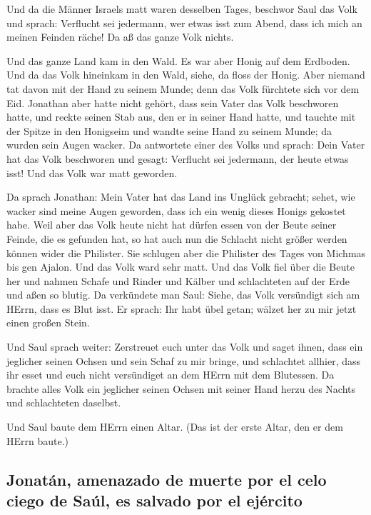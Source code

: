  Und da die Männer Israels matt waren desselben Tages,
beschwor Saul das Volk und sprach: Verflucht sei jedermann, wer etwas
isst zum Abend, dass ich mich an meinen Feinden räche! Da aß das ganze
Volk nichts.

 Und das ganze Land kam in den Wald. Es war aber Honig
auf dem Erdboden.  Und da das Volk hineinkam in den Wald,
siehe, da floss der Honig. Aber niemand tat davon mit der Hand zu seinem
Munde; denn das Volk fürchtete sich vor dem Eid. 
Jonathan aber hatte nicht gehört, dass sein Vater das Volk beschworen
hatte, und reckte seinen Stab aus, den er in seiner Hand hatte, und
tauchte mit der Spitze in den Honigseim und wandte seine Hand zu seinem
Munde; da wurden sein Augen wacker.  Da antwortete einer
des Volks und sprach: Dein Vater hat das Volk beschworen und gesagt:
Verflucht sei jedermann, der heute etwas isst! Und das Volk war matt
geworden.

 Da sprach Jonathan: Mein Vater hat das Land ins Unglück
gebracht; sehet, wie wacker sind meine Augen geworden, dass ich ein
wenig dieses Honigs gekostet habe.  Weil aber das Volk
heute nicht hat dürfen essen von der Beute seiner Feinde, die es
gefunden hat, so hat auch nun die Schlacht nicht größer werden können
wider die Philister.  Sie schlugen aber die Philister des
Tages von Michmas bis gen Ajalon. Und das Volk ward sehr matt.
 Und das Volk fiel über die Beute her und nahmen Schafe
und Rinder und Kälber und schlachteten auf der Erde und aßen so blutig.
 Da verkündete man Saul: Siehe, das Volk versündigt sich
am HErrn, dass es Blut isst. Er sprach: Ihr habt übel getan; wälzet her
zu mir jetzt einen großen Stein.

 Und Saul sprach weiter: Zerstreuet euch unter das Volk
und saget ihnen, dass ein jeglicher seinen Ochsen und sein Schaf zu mir
bringe, und schlachtet allhier, dass ihr esset und euch nicht
versündiget an dem HErrn mit dem Blutessen. Da brachte alles Volk ein
jeglicher seinen Ochsen mit seiner Hand herzu des Nachts und
schlachteten daselbst.

 Und Saul baute dem HErrn einen Altar. (Das ist der erste
Altar, den er dem HErrn baute.)

\hypertarget{jonatuxe1n-amenazado-de-muerte-por-el-celo-ciego-de-sauxfal-es-salvado-por-el-ejuxe9rcito}{%
\subsection{Jonatán, amenazado de muerte por el celo ciego de Saúl, es
salvado por el
ejército}\label{jonatuxe1n-amenazado-de-muerte-por-el-celo-ciego-de-sauxfal-es-salvado-por-el-ejuxe9rcito}}

